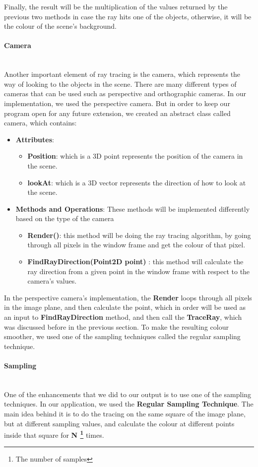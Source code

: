 \documentclass[a4paper]{article}
\newcommand{
	\subsubsubsection}[1]
{\paragraph{#1}\mbox{}\\[.35em]}
\begin{document}
	\par Finally, the result will be the multiplication of the values returned by the previous two methods in case the ray hits one of the objects, otherwise, it will be the colour of the scene's background.
	\subsubsubsection{Camera}
	\label{sssec:cam}Another important element of ray tracing is the camera, which represents the way of looking to the objects in the scene. There are many different types of cameras that can be used such as perspective and orthographic cameras. In our implementation, we used the perspective camera. But in order to keep our program open for any future extension, we created an abstract class called camera, which contains:
	\begin{itemize}
		\item \textbf{Attributes}:
		\begin{itemize} 
			\item \textbf{Position}: which is a 3D point represents the position of the camera in the scene.
			\item \textbf{lookAt}: which is a 3D vector represents the direction of how to look at the scene.
		\end{itemize}
		\item \textbf{Methods and Operations}: These methods will be implemented differently based on the type of the camera
		\begin{itemize} 
			\item \textbf{Render()}: this method will be doing the ray tracing algorithm, by going through all pixels in the window frame and get the colour of that pixel.
			\item \textbf{FindRayDirection(Point2D point)} : this method will calculate the ray direction from a given point in the window frame with respect to the camera's values.
		\end{itemize}
	\end{itemize}
	\par In the perspective camera's implementation, the \textbf{Render} loops through all pixels in the image plane,  and then calculate the point, which in order will be used as an input to \textbf{FindRayDirection} method, and then call the \textbf{TraceRay}, which was discussed before in the previous section. To make the resulting colour smoother, we used one of the sampling techniques called the regular sampling technique.
	\subsubsubsection{Sampling}
	One of the enhancements that we did to our output is to use one of the sampling techniques. In our application, we used the \textbf{Regular Sampling Technique}. The main idea behind it is to do the tracing on the same square of the image plane, but at different sampling values, and calculate the colour at different points inside that square for \textbf{N \footnote{The number of samples}} times.\\
\end{document}
